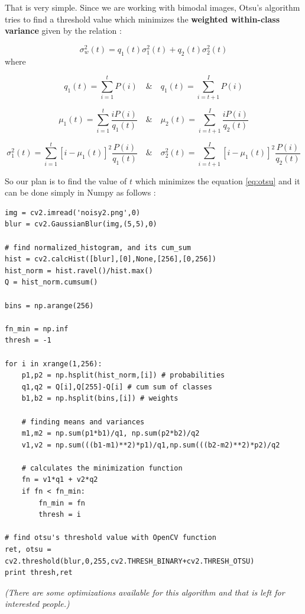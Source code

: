 \documentclass[a4paper,11pt]{book}
\begin{document}
That is very simple. Since we are working with bimodal images, Otsu's algorithm tries to find a threshold value which minimizes the \textbf{weighted within-class variance} given by the relation :

\begin{equation} \label{eq:otsu}
 \sigma_w^2(t) = q_1(t)\sigma_1^2(t)+q_2(t)\sigma_2^2(t)
\end{equation}
where

\begin{equation}
    q_1(t) = \sum_{i=1}^{t} P(i) \quad \& \quad q_1(t) = \sum_{i=t+1}^{I} P(i) 
\end{equation}

\begin{equation}
    \mu_1(t) = \sum_{i=1}^{t} \frac{iP(i)}{q_1(t)} \quad \& \quad \mu_2(t) = \sum_{i=t+1}^{I} \frac{iP(i)}{q_2(t)}
\end{equation}

\begin{equation}
    \sigma_1^2(t) = \sum_{i=1}^{t} [i-\mu_1(t)]^2 \frac{P(i)}{q_1(t)} \quad \& \quad \sigma_2^2(t) = \sum_{i=t+1}^{I} [i-\mu_1(t)]^2 \frac{P(i)}{q_2(t)}
\end{equation}

So our plan is to find the value of \( t \) which minimizes the equation \ref{eq:otsu} and it can be done simply in Numpy as follows :

\bigskip
\begin{lstlisting}
img = cv2.imread('noisy2.png',0)
blur = cv2.GaussianBlur(img,(5,5),0)

# find normalized_histogram, and its cum_sum
hist = cv2.calcHist([blur],[0],None,[256],[0,256])
hist_norm = hist.ravel()/hist.max()
Q = hist_norm.cumsum()

bins = np.arange(256)

fn_min = np.inf
thresh = -1

for i in xrange(1,256):
    p1,p2 = np.hsplit(hist_norm,[i]) # probabilities
    q1,q2 = Q[i],Q[255]-Q[i] # cum sum of classes
    b1,b2 = np.hsplit(bins,[i]) # weights
    
    # finding means and variances
    m1,m2 = np.sum(p1*b1)/q1, np.sum(p2*b2)/q2 
    v1,v2 = np.sum(((b1-m1)**2)*p1)/q1,np.sum(((b2-m2)**2)*p2)/q2
    
    # calculates the minimization function
    fn = v1*q1 + v2*q2
    if fn < fn_min:
        fn_min = fn
        thresh = i

# find otsu's threshold value with OpenCV function 
ret, otsu = cv2.threshold(blur,0,255,cv2.THRESH_BINARY+cv2.THRESH_OTSU)
print thresh,ret
\end{lstlisting}
\bigskip

\textit{(There are some optimizations available for this algorithm and that is left for interested people.)}
\end{document}
